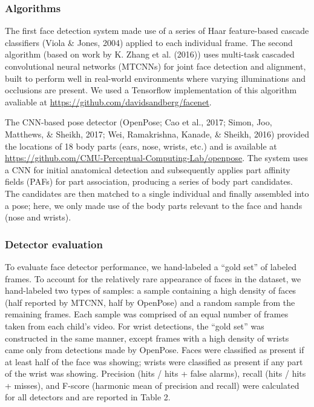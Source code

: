 \documentclass[10pt, letterpaper]{article}
\begin{document}
\subsubsection{Algorithms}\label{algorithms}

The first face detection system made use of a series of Haar
feature-based cascade classifiers (Viola \& Jones, 2004) applied to each
individual frame. The second algorithm (based on work by K. Zhang et al.
(2016)) uses multi-task cascaded convolutional neural networks (MTCNNs)
for joint face detection and alignment, built to perform well in
real-world environments where varying illuminations and occlusions are
present. We used a Tensorflow implementation of this algorithm avaliable
at \url{https://github.com/davidsandberg/facenet}.

The CNN-based pose detector (OpenPose; Cao et al., 2017; Simon, Joo,
Matthews, \& Sheikh, 2017; Wei, Ramakrishna, Kanade, \& Sheikh, 2016)
provided the locations of 18 body parts (ears, nose, wrists, etc.) and
is available at
\url{https://github.com/CMU-Perceptual-Computing-Lab/openpose}. The
system uses a CNN for initial anatomical detection and subsequently
applies part affinity fields (PAFs) for part association, producing a
series of body part candidates. The candidates are then matched to a
single individual and finally assembled into a pose; here, we only made
use of the body parts relevant to the face and hands (nose and wrists).

\subsubsection{Detector evaluation}\label{detector-evaluation}

To evaluate face detector performance, we hand-labeled a ``gold set'' of
labeled frames. To account for the relatively rare appearance of faces
in the dataset, we hand-labeled two types of samples: a sample
containing a high density of faces (half reported by MTCNN, half by
OpenPose) and a random sample from the remaining frames. Each sample was
comprised of an equal number of frames taken from each child's video.
For wrist detections, the ``gold set'' was constructed in the same
manner, except frames with a high density of wrists came only from
detections made by OpenPose. Faces were classified as present if at
least half of the face was showing; wrists were classified as present if
any part of the wrist was showing. Precision (hits / hits + false
alarms), recall (hits / hits + misses), and F-score (harmonic mean of
precision and recall) were calculated for all detectors and are reported
in Table 2.
\end{document}
